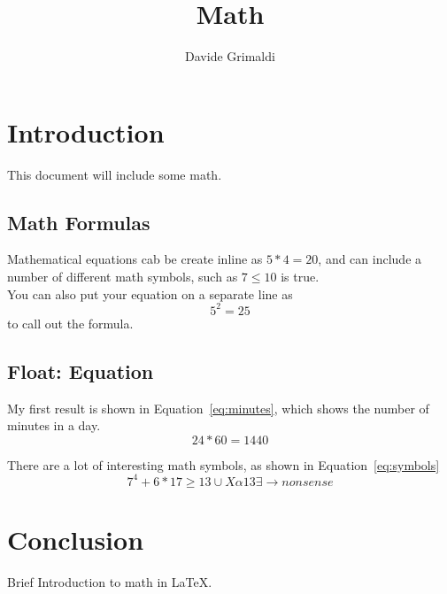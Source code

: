 \documentclass{article}
\title{Math}
\author{Davide Grimaldi}
\date{}
\begin{document}
    \maketitle
    \section{Introduction}
        This document will include some math.

        \subsection{Math Formulas}
            Mathematical equations cab be create inline as $5*4=20$, and can include a number of different math symbols, such as $7\leq 10$ is true.\\
            You can also put your equation on a separate line as \[5^2=25\] to call out the formula.

        \subsection{Float: Equation}
            My first result is shown in Equation~\ref{eq:minutes}, which shows the number of minutes in a day.
            \begin{equation}
                24*60 = 1440
                \label{eq:minutes}
            \end{equation}

            There are a lot of interesting math symbols, as shown in Equation~\ref{eq:symbols}
            \begin{equation}
                7^4+6*17\geq 13 \cup X \alpha 13 \exists \rightarrow nonsense
                \label{eq:symbols}
            \end{equation}

    \section{Conclusion}
            Brief Introduction to math in \LaTeX.
\end{document}
